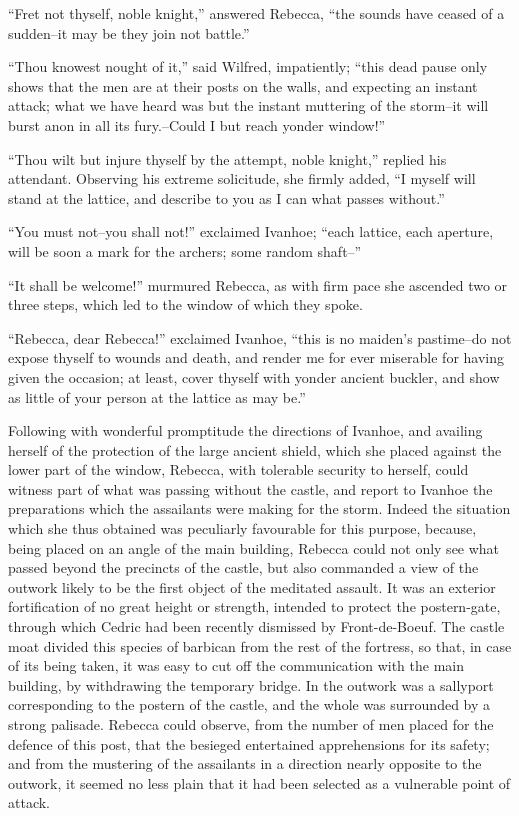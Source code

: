 ``Fret not thyself, noble knight,'' answered Rebecca, ``the sounds have
ceased of a sudden--it may be they join not battle.''

``Thou knowest nought of it,'' said Wilfred, impatiently; ``this dead
pause only shows that the men are at their posts on the walls, and
expecting an instant attack; what we have heard was but the instant
muttering of the storm--it will burst anon in all its fury.--Could I but
reach yonder window!''

``Thou wilt but injure thyself by the attempt, noble knight,'' replied
his attendant. Observing his extreme solicitude, she firmly added, ``I
myself will stand at the lattice, and describe to you as I can what
passes without.''

``You must not--you shall not!'' exclaimed Ivanhoe; ``each lattice, each
aperture, will be soon a mark for the archers; some random shaft--''

``It shall be welcome!'' murmured Rebecca, as with firm pace she
ascended two or three steps, which led to the window of which they
spoke.

``Rebecca, dear Rebecca!'' exclaimed Ivanhoe, ``this is no maiden's
pastime--do not expose thyself to wounds and death, and render me for
ever miserable for having given the occasion; at least, cover thyself
with yonder ancient buckler, and show as little of your person at the
lattice as may be.''

Following with wonderful promptitude the directions of Ivanhoe, and
availing herself of the protection of the large ancient shield, which
she placed against the lower part of the window, Rebecca, with tolerable
security to herself, could witness part of what was passing without the
castle, and report to Ivanhoe the preparations which the assailants were
making for the storm. Indeed the situation which she thus obtained was
peculiarly favourable for this purpose, because, being placed on an
angle of the main building, Rebecca could not only see what passed
beyond the precincts of the castle, but also commanded a view of the
outwork likely to be the first object of the meditated assault. It was
an exterior fortification of no great height or strength, intended to
protect the postern-gate, through which Cedric had been recently
dismissed by Front-de-Boeuf. The castle moat divided this species of
barbican from the rest of the fortress, so that, in case of its being
taken, it was easy to cut off the communication with the main building,
by withdrawing the temporary bridge. In the outwork was a sallyport
corresponding to the postern of the castle, and the whole was surrounded
by a strong palisade. Rebecca could observe, from the number of men
placed for the defence of this post, that the besieged entertained
apprehensions for its safety; and from the mustering of the assailants
in a direction nearly opposite to the outwork, it seemed no less plain
that it had been selected as a vulnerable point of attack.


